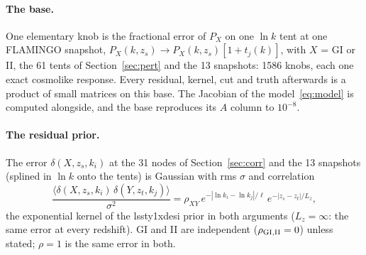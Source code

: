 \documentclass[11pt]{article}
\begin{document}
\paragraph{The base.}
One elementary knob is the fractional error of $P_X$ on one $\ln k$ tent at
one FLAMINGO snapshot, $P_X(k, z_s) \to P_X(k, z_s)[1 + t_j(k)]$, with
$X$ = GI or II, the 61 tents of Section~\ref{sec:pert} and the 13
snapshots: 1586 knobs, each one exact cosmolike response. Every residual,
kernel, cut and truth afterwards is a product of small matrices on this
base. The Jacobian of the model~\eqref{eq:model} is computed alongside, and
the base reproduces its $A$ column to $10^{-8}$.

\paragraph{The residual prior.}
The error $\delta(X, z_s, k_i)$ at the 31 nodes of
Section~\ref{sec:corr} and the 13 snapshots (splined in $\ln k$ onto the
tents) is Gaussian with rms $\sigma$ and correlation
\begin{equation}
  \frac{\langle \delta(X, z_s, k_i)\,\delta(Y, z_t, k_j)\rangle}{\sigma^2}
  = \rho_{XY}\, e^{-|\ln k_i - \ln k_j|/\ell}\, e^{-|z_s - z_t|/L_z},
  \label{eq:v9prior}
\end{equation}
the exponential kernel of the lssty1xdesi prior in both arguments
($L_z = \infty$: the same error at every redshift). GI and II are
independent ($\rho_{\rm GI,II} = 0$) unless stated; $\rho = 1$ is the same
error in both.
\end{document}
